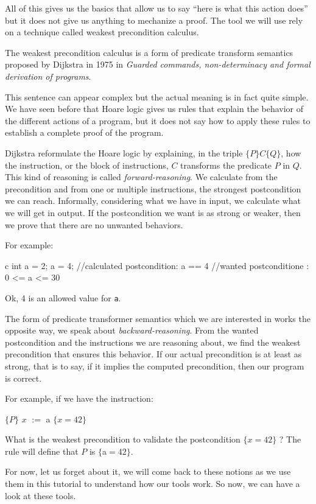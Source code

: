 All of this gives us the basics that allow us to say ``here is what
this action does'' but it does not give us anything to mechanize a
proof. The tool we will use rely on a technique called weakest
precondition calculus.





The weakest precondition calculus is a form of predicate transform
semantics proposed by Dijkstra in 1975 in \emph{Guarded commands,
non-determinacy and formal derivation of programs}.

This sentence can appear complex but the actual meaning is in fact quite
simple. We have seen before that Hoare logic gives us rules that explain
the behavior of the different actions of a program, but it does not say
how to apply these rules to establish a complete proof of the program.

Dijkstra reformulate the Hoare logic by explaining, in the triple
$\{P\}C\{Q\}$, how the instruction, or the block of instructions,
$C$ transforms the predicate $P$ in $Q$. This kind of reasoning is
called \emph{forward-reasoning}. We calculate from the precondition and
from one or multiple instructions, the strongest postcondition we can
reach. Informally, considering what we have in input, we calculate what
we will get in output. If the postcondition we want is as strong or
weaker, then we prove that there are no unwanted behaviors.



For example:



\begin{CodeBlock}{c}
int a = 2;
a = 4;
//calculated postcondition: a == 4
//wanted postconditione   : 0 <= a <= 30
\end{CodeBlock}



Ok, 4 is an allowed value for \texttt{a}.



The form of predicate transformer semantics which we are interested in
works the opposite way, we speak about \emph{backward-reasoning}. From
the wanted postcondition and the instructions we are reasoning about, we
find the weakest precondition that ensures this behavior. If our actual
precondition is at least as strong, that is to say, if it implies the
computed precondition, then our program is correct.



For example, if we have the instruction:



$\{P\}$ $x$ $:=$ a $\{x = 42\}$



What is the weakest precondition to validate the postcondition
$\{x = 42\}$ ? The rule will define that $P$ is $\{$a$=42\}$.



For now, let us forget about it, we will come back to these notions as
we use them in this tutorial to understand how our tools work. So now,
we can have a look at these tools.
